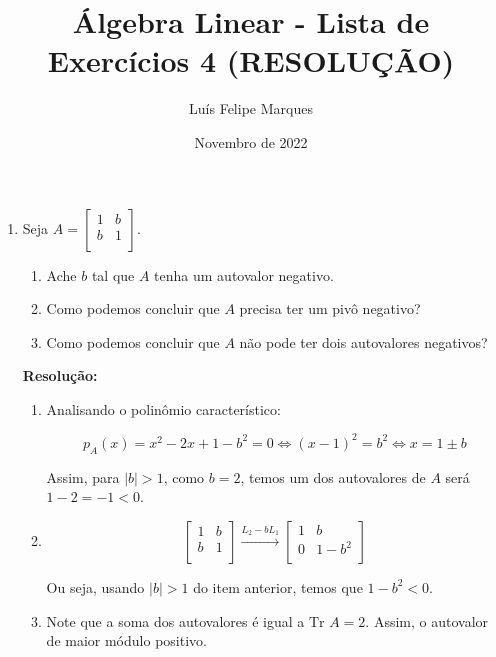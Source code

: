 \documentclass[leqno]{article}
\title{Álgebra Linear - Lista de Exercícios 4 (RESOLUÇÃO)}
\author{Luís Felipe Marques}
\date{Novembro de 2022}
\begin{document}
 
\maketitle

\begin{enumerate}
    \item Seja $A=\begin{bmatrix}
    1 & b\\
    b & 1\\
    \end{bmatrix}$.
    
    \begin{enumerate}
        \item Ache $b$ tal que $A$ tenha um autovalor negativo.
        
        \item Como podemos concluir que $A$ precisa ter um pivô negativo?
        
        \item Como podemos concluir que $A$ não pode ter dois autovalores negativos?
    \end{enumerate}
    
    \textbf{Resolução:}

    \begin{enumerate}
        \item Analisando o polinômio característico:
        
        $$p_A(x)=x^2-2x+1-b^2=0\iff (x-1)^2=b^2\iff x=1\pm b$$
        
        Assim, para $|b|>1$, como $b=2$, temos um dos autovalores de $A$ será $1-2=-1<0$.
        
        \item
        
        $$\begin{bmatrix}
        1 & b\\
        b & 1\\
        \end{bmatrix}\xrightarrow{L_2-bL_1}\begin{bmatrix}
        1 & b\\
        0 & 1-b^2\\
        \end{bmatrix}$$
        
        Ou seja, usando $|b|>1$ do item anterior, temos que $1-b^2<0$.
        
        \item Note que a soma dos autovalores é igual a $\text{Tr } A=2$. Assim, o autovalor de maior módulo positivo.
    \end{enumerate}
    

\end{enumerate}
\end{document}
